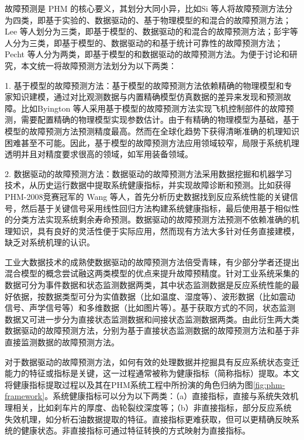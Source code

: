 故障预测是 PHM 的核心要义，其划分大同小异，比如Si 等人将故障预测方法分为四类，即基于实验的、数据驱动的、基于物理模型的和混合的故障预测方法\cite{si2011remaining}；Lee 等人划分为三类，即基于模型的、数据驱动的和混合的故障预测方法\cite{lee2014prognostics}；彭宇等人分为三类，即基于模型的、数据驱动的和基于统计可靠性的故障预测方法\cite{彭宇2010故障预测与健康管理技术综述}；Pecht 等人分为两类，即基于模型的和数据驱动的故障预测方法\cite{pecht2010prognostics}。为便于讨论和研究，本文统一将故障预测方法划分为以下两类：

1. 基于模型的故障预测方法：基于模型的故障预测方法依赖精确的物理模型和专家知识建模，通过对比观测数据与内置精确模型仿真数据的差异来发现和预测故障。比如Byington 等人采用基于模型的故障预测方法实现飞机控制部件的故障预测，需要配置精确的物理模型实现参数估计\cite{byington2004model}。由于有精确的物理模型为基础，基于模型的故障预测方法预测精度最高。然而在全球化趋势下获得清晰准确的机理知识困难甚至不可能。因此，基于模型的故障预测方法应用领域较窄，局限于系统机理透明并且对精度要求很高的领域，如军用装备领域。

2. 数据驱动的故障预测方法：数据驱动的故障预测方法采用数据挖掘和机器学习技术，从历史运行数据中提取系统健康指标，并实现故障诊断和预测。比如获得PHM-2008竞赛冠军的 Wang 等人\cite{wang2008similarity}，首先分析历史数据找到反应系统性能的关键信号，然后基于关键信号采用线性回归方法构建系统健康指标，最后使用基于相似性的分类方法实现系统剩余寿命预测。数据驱动的故障预测方法预测不依赖准确的机理知识，具有良好的灵活性便于实际应用，然而现有方法大多针对任务直接建模，缺乏对系统机理的认识。

工业大数据技术的成熟使数据驱动的故障预测方法倍受青睐\cite{tsui2015prognostics,si2011remaining}，有少部分学者还提出混合模型的概念尝试融这两类模型的优点来提升故障预精度\cite{pecht2010prognostics}。针对工业系统采集的数据可分为事件数据和状态监测数据两类，其中状态监测数据是反应系统性能的最好依据，按数据类型可分为实值数据（比如温度、湿度等）、波形数据（比如震动信号、声学信号等）和多维数据（比如图片等）\cite{jardine2006review}。基于获取方式的不同，状态监测数据又可进一步分为直接状态监测数据和间接状态监测数据两类。由此衍生两大类数据驱动的故障预测方法，分别为基于直接状态监测数据的故障预测方法和基于非直接监测数据的故障预测方法\cite{si2011remaining}。

对于数据驱动的故障预测方法，如何有效的处理数据并挖掘具有反应系统状态变迁能力的特征或指标是关键，这一过程通常被称为健康指标（简称指标）提取\cite{pecht2010prognostics}。本文将健康指标提取过程以及其在PHM系统工程中所扮演的角色归纳为图\ref{fig:phm-framework}。系统健康指标可以分为以下两类\cite{zhou2011latent}：（a）直接指标，直接与系统失效机理相关，比如刹车片的厚度、齿轮裂纹深度等；（b）非直接指标，部分反应系统失效机理，如分析石油数据提取的特征。直接指标更难获取，但可以更精确反映系统的健康状态。非直接指标可通过特征转换的方式映射为直接指标\cite{si2011remaining,zhou2011latent}。


